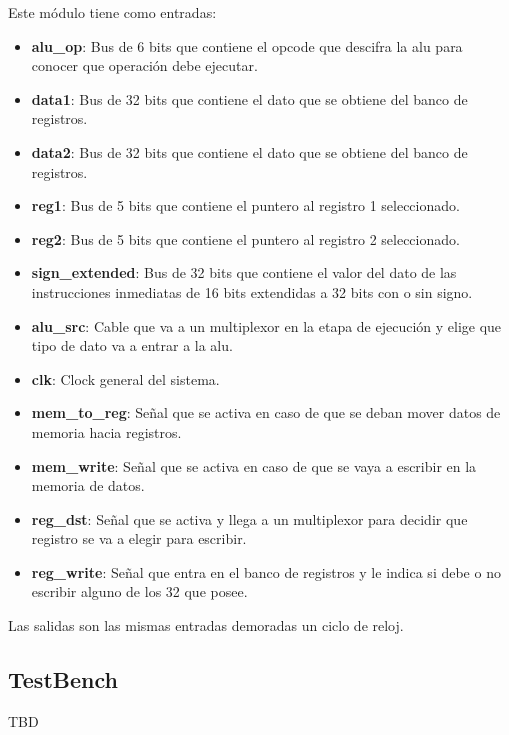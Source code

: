 Este m\'odulo tiene como entradas:
\begin{itemize}
  \item \textbf{alu\_op}: Bus de 6 bits que contiene el opcode que descifra la alu para conocer que operaci\'on debe ejecutar.
  \item \textbf{data1}: Bus de 32 bits que contiene el dato que se obtiene del banco de registros.
  \item \textbf{data2}: Bus de 32 bits que contiene el dato que se obtiene del banco de registros.
  \item \textbf{reg1}: Bus de 5 bits que contiene el puntero al registro 1 seleccionado.
  \item \textbf{reg2}: Bus de 5 bits que contiene el puntero al registro 2 seleccionado.
  \item \textbf{sign\_extended}: Bus de 32 bits que contiene el valor del dato de las instrucciones inmediatas de 16 bits extendidas a 32 bits con o sin signo.
  \item \textbf{alu\_src}: Cable que va a un multiplexor en la etapa de ejecuci\'on y elige que tipo de dato va a entrar a la alu. 
  \item \textbf{clk}: Clock general del sistema.
  \item \textbf{mem\_to\_reg}: Señal que se activa en caso de que se deban mover datos de memoria hacia registros.
  \item \textbf{mem\_write}: Señal que se activa en caso de que se vaya a escribir en la memoria de datos.
  \item \textbf{reg\_dst}: Señal que se activa y llega a un multiplexor para decidir que registro se va a elegir para escribir.
  \item \textbf{reg\_write}: Señal que entra en el banco de registros y le indica si debe o no escribir alguno de los 32 que posee.
\end{itemize}

Las salidas son las mismas entradas demoradas un ciclo de reloj.

\subsection{TestBench}
TBD